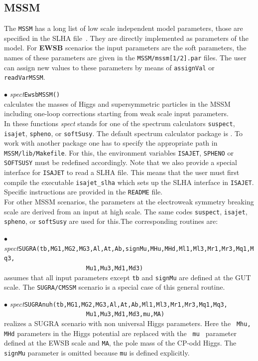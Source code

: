 \documentclass[12pt,a4paper]{article}
\begin{document}
\subsection{MSSM}
The {\tt MSSM} has a long list of low scale  independent model 
parameters, those are specified in the SLHA file~\cite{Skands:2003cj,Allanach:2008qq}.
They are directly implemented as parameters of the model.
For {\bf EWSB} scenarios the input parameters are  the soft parameters, the names 
of these parameters are given in the {\tt MSSM/mssm[1/2].par} files.
The user  can assign new values to these parameters by means of {\tt assignVal}
or {\tt readVarMSSM}.

\noindent $\bullet$ {\it spect}\verb|EwsbMSSM()|\\
 calculates the  masses of Higgs  and
supersymmetric particles in the MSSM including one-loop
corrections starting from weak scale input parameters. \\
In these functions {\it spect} stands for one of
the spectrum calculators {\tt suspect}, {\tt isajet},
{\tt spheno}, or {\tt softSusy}.
The  default spectrum calculator package is {\suspect}. To work
with another package one has to specify the appropriate path in
\verb|MSSM/lib/Makefile|. For this,  the environment variables
\verb|ISAJET|, \verb|SPHENO| or \verb|SOFTSUSY| must be redefined
accordingly. Note that we also provide a special interface for
\verb|ISAJET| to read a SLHA file. This means that the user must
first compile the executable \verb|isajet_slha| which sets up the  SLHA 
interface in  {\tt ISAJET}. Specific instructions are provided in the \verb|README| file.\\
 

For other MSSM scenarios, the   parameters at the electroweak symmetry breaking scale are derived from 
an  input at high scale. The same codes {\tt suspect}, {\tt isajet},
{\tt spheno}, or {\tt softSusy} are used for this.The corresponding
routines are:

\noindent $\bullet$ {\it
spect}\verb|SUGRA(tb,MG1,MG2,MG3,Al,At,Ab,signMu,MHu,MHd,Ml1,Ml3,Mr1,Mr3,Mq1,Mq3,|\\
\verb|                       Mu1,Mu3,Md1,Md3)|\\
assumes that  all input parameters except {\tt tb} and {\tt signMu}  are
defined at the GUT scale. The {\tt SUGRA/CMSSM} scenario is a special case of this general routine. 

\noindent $\bullet$ {\it
spect}\verb|SUGRAnuh(tb,MG1,MG2,MG3,Al,At,Ab,Ml1,Ml3,Mr1,Mr3,Mq1,Mq3,|\\
\verb|                       Mu1,Mu3,Md1,Md3,mu,MA)|\\
realizes a SUGRA scenario with non universal Higgs parameters. Here the {\tt
Mhu, MHd} parameters in the Higgs potential are replaced with the {\tt
mu } parameter defined at the  EWSB scale and {\tt MA}, the pole mass of the CP-odd Higgs. The
{\tt signMu} parameter is omitted  because {\tt mu} is defined
explicitly.
\end{document}
